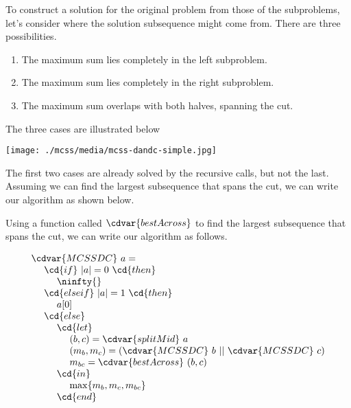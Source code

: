 \begin{cluster}
\label{grp:grm:mcss::using-solutions-to-subproblems}

\begin{gram}
\label{grm:mcss::using-solutions-to-subproblems}
To construct a solution for the original problem from those of the
subproblems, let's consider where the solution subsequence might come
from.  There are three possibilities.
\begin{enumerate}
\item  
The maximum sum lies completely in the left subproblem.

\item 
The maximum sum lies completely in the right subproblem.

\item
The maximum sum overlaps with both halves, spanning the cut.
\end{enumerate}

The three cases are illustrated below

\begin{center}
\texttt{[image: ./mcss/media/mcss-dandc-simple.jpg]}
\end{center}

The first two cases are already solved by the recursive calls, but not
the last.  Assuming we can find the largest subsequence that spans the
cut, we can write our algorithm as shown below.

\end{gram}
\end{cluster}

\begin{cluster}
\label{grp:alg:mcss::dc::first}

\begin{algorithm}
\label{alg:mcss::dc::first}
Using a function called $\cdvar{bestAcross}$ to find the largest
subsequence that spans the cut, we can write our algorithm as follows.

\[
\begin{array}{l}
\cdvar{MCSSDC}~a =
\\
~~~~\cd{if}~ |a| = 0~\cd{then}
\\
~~~~~~~~\ninfty{}
\\
~~~~\cd{else if}~|a| = 1 ~\cd{then}
\\ 
~~~~~~~~a[0]
\\
~~~~\cd{else}
\\ 
~~~~~~~~\cd{let}
\\ 
~~~~~~~~~~~~(b, c)  = \cdvar{splitMid}~a
\\ 
~~~~~~~~~~~~(m_b, m_c) = \left( \cdvar{MCSSDC}~b \ ||\ \cdvar{MCSSDC}~c \right)
\\ 
~~~~~~~~~~~~m_{bc} = \cdvar{bestAcross}~(b, c)
\\ 
~~~~~~~~\cd{in}
\\ 
~~~~~~~~~~~~\max\{m_b, m_c, m_{bc}\}
\\ 
~~~~~~~~\cd{end}
\end{array} 
\]

\end{algorithm}
\end{cluster}

